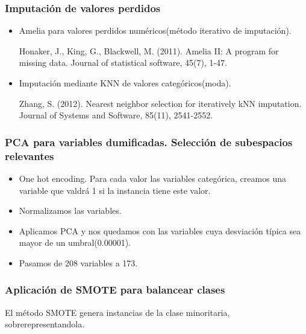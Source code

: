 \begin{frame}

\frametitle{Imputación de valores perdidos}

\begin{itemize}
	\item Amelia para valores perdidos numéricos(método iterativo de imputación).
	
	Honaker, J., King, G.,  Blackwell, M. (2011). Amelia II: A program for missing data. Journal of statistical software, 45(7), 1-47.
	
	\item Imputación mediante KNN de valores categóricos(moda).
	
	Zhang, S. (2012). Nearest neighbor selection for iteratively kNN imputation. Journal of Systems and Software, 85(11), 2541-2552.
	
\end{itemize}

\end{frame}


\begin{frame}
\frametitle{PCA para variables dumificadas. Selección de subespacios relevantes}

\begin{itemize}
	\item One hot encoding. Para cada valor las variables categórica, creamos una variable que valdrá 1 si la instancia tiene este valor.
	
	\item Normalizamos las variables.
	\item Aplicamos PCA y nos quedamos con las variables cuya desviación típica sea mayor de un umbral(0.00001).
	\item Pasamos de 208 variables a 173.
\end{itemize}

\end{frame}

\begin{frame}
\frametitle{Aplicación de SMOTE para balancear clases}

El método SMOTE genera instancias de la clase minoritaria, sobrerepresentandola. 

\end{frame}


